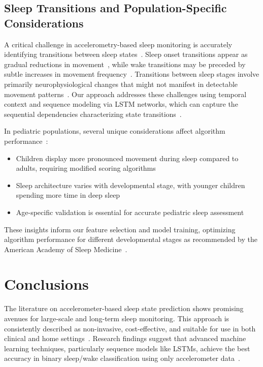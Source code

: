 \documentclass[conference]{IEEEtran}
\begin{document}
\subsection{Sleep Transitions and Population-Specific Considerations}

A critical challenge in accelerometry-based sleep monitoring is accurately identifying transitions between sleep states~\cite{aasm2015, littner2003}. Sleep onset transitions appear as gradual reductions in movement~\cite{sadeh1994activity}, while wake transitions may be preceded by subtle increases in movement frequency~\cite{kushida2001}. Transitions between sleep stages involve primarily neurophysiological changes that might not manifest in detectable movement patterns~\cite{rechtschaffen1968, sadeh2011}. Our approach addresses these challenges using temporal context and sequence modeling via LSTM networks, which can capture the sequential dependencies characterizing state transitions~\cite{borbely1982}.

In pediatric populations, several unique considerations affect algorithm performance~\cite{arXiv2023, acebo2006}:

\begin{itemize}
	\item Children display more pronounced movement during sleep compared to adults, requiring modified scoring algorithms~\cite{sadeh2011, acebo2006}
	\item Sleep architecture varies with developmental stage, with younger children spending more time in deep sleep~\cite{rechtschaffen1968, aasm2007}
	\item Age-specific validation is essential for accurate pediatric sleep assessment~\cite{sadeh2011}
\end{itemize}

These insights inform our feature selection and model training, optimizing algorithm performance for different developmental stages as recommended by the American Academy of Sleep Medicine~\cite{littner2003, sadeh2011}.

\section{Conclusions}

The literature on accelerometer-based sleep state prediction shows promising avenues for large-scale and long-term sleep monitoring. This approach is consistently described as non-invasive, cost-effective, and suitable for use in both clinical and home settings~\cite{pmc4883440, researchgate2021, sadeh2011, littner2003}. Research findings suggest that advanced machine learning techniques, particularly sequence models like LSTMs, achieve the best accuracy in binary sleep/wake classification using only accelerometer data~\cite{zhang2020machine, behar2013}.
\end{document}
